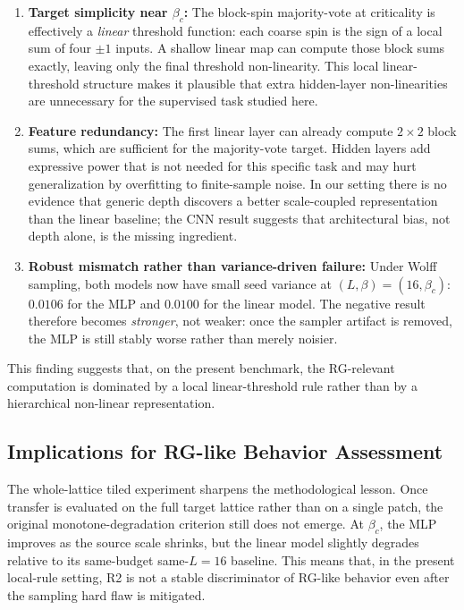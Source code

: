 \documentclass[12pt,a4paper]{memoir}
\begin{document}
\begin{enumerate}
    \item[(i)] \textbf{Target simplicity near $\beta_c$:} The block-spin
        majority-vote at criticality is effectively a \emph{linear}
        threshold function: each coarse spin is the sign of a local sum of
        four $\pm1$ inputs.  A shallow linear map can compute those block sums
        exactly, leaving only the final threshold non-linearity.  This local
        linear-threshold structure makes it plausible that extra hidden-layer
        non-linearities are unnecessary for the supervised task studied here.

    \item[(ii)] \textbf{Feature redundancy:} The first linear layer can
        already compute $2\times2$ block sums, which are sufficient for
        the majority-vote target.  Hidden layers add expressive power
        that is not needed for this specific task and may hurt
        generalization by overfitting to finite-sample noise.  In our setting
        there is no evidence that generic depth discovers a better scale-coupled
        representation than the linear baseline; the CNN result suggests that
        architectural bias, not depth alone, is the missing ingredient.

    \item[(iii)] \textbf{Robust mismatch rather than variance-driven failure:}
        Under Wolff sampling, both models now have small seed variance at
        $(L,\beta)=(16,\beta_c)$: $0.0106$ for the MLP and $0.0100$ for the
        linear model.  The negative result therefore becomes \emph{stronger},
        not weaker: once the sampler artifact is removed, the MLP is still
        stably worse rather than merely noisier.
\end{enumerate}

This finding suggests that, on the present benchmark, the RG-relevant
computation is dominated by a local linear-threshold rule rather than by a
hierarchical non-linear representation.

\subsection{Implications for RG-like Behavior Assessment}

The whole-lattice tiled experiment sharpens the methodological lesson.
Once transfer is evaluated on the full target lattice rather than on a
single patch, the original monotone-degradation criterion still does not
emerge.  At $\beta_c$, the MLP improves as the source scale shrinks, but the
linear model slightly degrades relative to its same-budget same-$L=16$
baseline.  This means that, in the present local-rule setting, R2 is not a
stable discriminator of RG-like behavior even after the sampling hard flaw is
mitigated.
\end{document}
